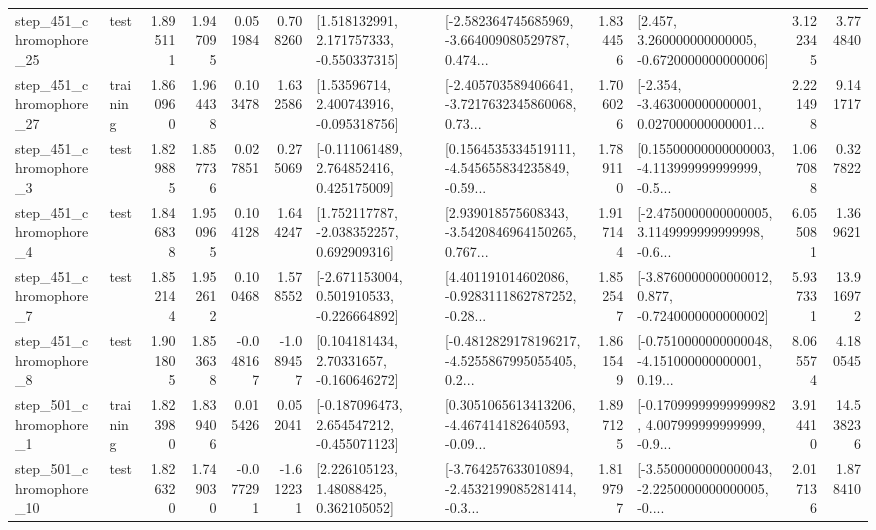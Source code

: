 \begin{tabular}{llrrrrllrlrr}
  step\_451\_chromophore\_25 &      test &      1.895111 &    1.947095 &      0.051984 &  0.708260 &    [1.518132991, 2.171757333, -0.550337315] &  [-2.582364745685969, -3.664009080529787, 0.474... &       1.834456 &    [2.457, 3.260000000000005, -0.6720000000000006] &            3.122345 &          3.774840 \\
  step\_451\_chromophore\_27 &  training &      1.860960 &    1.964438 &      0.103478 &  1.632586 &     [1.53596714, 2.400743916, -0.095318756] &  [-2.405703589406641, -3.7217632345860068, 0.73... &       1.706026 &  [-2.354, -3.463000000000001, 0.027000000000001... &            2.221498 &          9.141717 \\
   step\_451\_chromophore\_3 &      test &      1.829885 &    1.857736 &      0.027851 &  0.275069 &    [-0.111061489, 2.764852416, 0.425175009] &  [0.1564535334519111, -4.545655834235849, -0.59... &       1.789110 &  [0.15500000000000003, -4.113999999999999, -0.5... &            1.067088 &          0.327822 \\
   step\_451\_chromophore\_4 &      test &      1.846838 &    1.950965 &      0.104128 &  1.644247 &    [1.752117787, -2.038352257, 0.692909316] &  [2.939018575608343, -3.5420846964150265, 0.767... &       1.917144 &  [-2.4750000000000005, 3.1149999999999998, -0.6... &            6.055081 &          1.369621 \\
   step\_451\_chromophore\_7 &      test &      1.852144 &    1.952612 &      0.100468 &  1.578552 &   [-2.671153004, 0.501910533, -0.226664892] &  [4.401191014602086, -0.9283111862787252, -0.28... &       1.852547 &  [-3.8760000000000012, 0.877, -0.7240000000000002] &            5.937331 &         13.916972 \\
   step\_451\_chromophore\_8 &      test &      1.901805 &    1.853638 &     -0.048167 & -1.089457 &     [0.104181434, 2.70331657, -0.160646272] &  [-0.4812829178196217, -4.5255867995055405, 0.2... &       1.861549 &  [-0.7510000000000048, -4.151000000000001, 0.19... &            8.065574 &          4.180545 \\
   step\_501\_chromophore\_1 &  training &      1.823980 &    1.839406 &      0.015426 &  0.052041 &   [-0.187096473, 2.654547212, -0.455071123] &  [0.3051065613413206, -4.467414182640593, -0.09... &       1.897125 &  [-0.17099999999999982, 4.007999999999999, -0.9... &            3.914410 &         14.538236 \\
  step\_501\_chromophore\_10 &      test &      1.826320 &    1.749030 &     -0.077291 & -1.612231 &      [2.226105123, 1.48088425, 0.362105052] &  [-3.764257633010894, -2.4532199085281414, -0.3... &       1.819797 &  [-3.5500000000000043, -2.2250000000000005, -0.... &            2.017136 &          1.878410 \\

\end{tabular}
